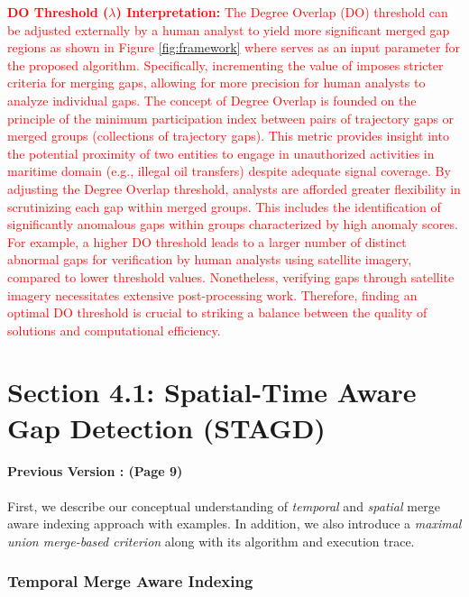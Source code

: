 \documentclass[twoside,leqno,onecolumn]{article}
\begin{document}
\textcolor{red}{\textbf{DO Threshold ($\lambda$) Interpretation:} The Degree Overlap (DO) threshold can be adjusted externally by a human analyst to yield more significant merged gap regions as shown in Figure \ref{fig:framework} where  serves as an input parameter for the proposed algorithm. Specifically, incrementing the value of imposes stricter criteria for merging gaps, allowing for more precision for human analysts to analyze individual gaps. The concept of Degree Overlap is founded on the principle of the minimum participation index between pairs of trajectory gaps or merged groups (collections of trajectory gaps). This metric provides insight into the potential proximity of two entities to engage in unauthorized activities in maritime domain (e.g., illegal oil transfers) despite adequate signal coverage. By adjusting the Degree Overlap threshold, analysts are afforded greater flexibility in scrutinizing each gap within merged groups. This includes the identification of significantly anomalous gaps within groups characterized by high anomaly scores. For example, a higher DO threshold  leads to a larger number of distinct abnormal gaps for verification by human analysts using satellite imagery, compared to lower threshold values. Nonetheless, verifying gaps through satellite imagery necessitates extensive post-processing work. Therefore, finding an optimal DO threshold is crucial to striking a balance between the quality of solutions and computational efficiency.}

\section{Section 4.1: Spatial-Time Aware Gap Detection (STAGD) \\}
\paragraph{Previous Version : (Page 9) \\}
First, we describe our conceptual understanding of \textit{temporal} and \textit{spatial} merge aware indexing approach with examples. In addition, we also introduce a \textit{maximal union merge-based criterion} along with its algorithm and execution trace.%

\subsubsection{Temporal Merge Aware Indexing}
\label{subsubsection:Time based indexing}
\end{document}
